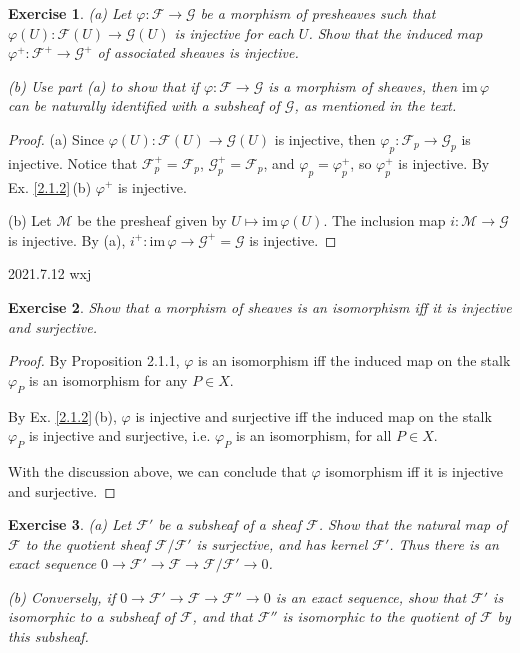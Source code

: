 \documentclass{amsart}
\newtheorem{exe}{Exercise}[subsection]
\begin{document}
\begin{exe}
	\label{2.1.4}
    (a) Let $\varphi :\mathscr{F} \rightarrow  \mathscr{G} $ be a morphism of presheaves such that $\varphi(U) :\mathscr{F}(U) \rightarrow  \mathscr{G}(U) $
    is injective for each $U$. Show that the induced map $\varphi^+ :\mathscr{F}^+ \rightarrow  \mathscr{G}^+ $ of associated sheaves
    is injective.

    (b) Use part (a) to show that if $\varphi :\mathscr{F} \rightarrow  \mathscr{G} $ is a morphism of sheaves,
    then $\mathrm{im}\,\varphi$ can be naturally identified with a subsheaf of $ \mathscr{G}$, as mentioned in the text.
\end{exe}

\begin{proof}
    (a) Since $\varphi(U) :\mathscr{F}(U) \rightarrow  \mathscr{G}(U) $ is injective, then $\varphi_p :\mathscr{F}_p \rightarrow  \mathscr{G}_p $ is injective.
    Notice that $\mathscr{F}_p^+=\mathscr{F}_p$, $\mathscr{G}_p^+=\mathscr{F}_p$, and $\varphi_p=\varphi_p^+$, so $\varphi_p^+$ is injective.
    By Ex. \ref{2.1.2}\,(b) $\varphi^+$ is injective.

    (b) Let $\mathscr{M}$ be the presheaf given by $U\mapsto\mathrm{im}\,\varphi(U)$. The inclusion map $i: \mathscr{M} \rightarrow  \mathscr{G}$ is injective. By (a), $i^+:\mathrm{im}\,\varphi \rightarrow  \mathscr{G}^+=\mathscr{G}$
    is injective.
\end{proof}    

2021.7.12 wxj
\begin{exe}
	\label{2.1.5}
   Show that a morphism of sheaves is an isomorphism iff it is injective and surjective.
\end{exe}

\begin{proof}
   By Proposition 2.1.1, $\varphi$ is an isomorphism iff the induced map on the stalk $\varphi_{P}$ is an isomorphism for any $P \in X$. 
   
   By Ex. \ref{2.1.2}\,(b), $\varphi$ is injective and surjective iff the induced map on the stalk $\varphi_{P}$ is injective and surjective, i.e. $\varphi_P$ is an isomorphism, for all $P \in X$.
   
   With the discussion above, we can conclude that $\varphi$ isomorphism iff it is injective and surjective.
\end{proof}

\begin{exe}
   (a) Let $\mathscr{F}'$ be a subsheaf of a sheaf $\mathscr{F}$. Show that the natural map of $\mathscr{F}$ to the quotient sheaf $\mathscr{F}/\mathscr{F}'$ is surjective, and has kernel $\mathscr{F}'$. Thus there is an exact sequence $0 \rightarrow \mathscr{F}' \rightarrow \mathscr{F} \rightarrow \mathscr{F}/\mathscr{F}' \rightarrow 0$.
   
   (b) Conversely, if $0 \rightarrow \mathscr{F}' \rightarrow \mathscr{F} \rightarrow \mathscr{F}'' \rightarrow 0$ is an exact sequence, show that $\mathscr{F}'$ is isomorphic to a subsheaf of $\mathscr{F}$, and that $\mathscr{F}''$ is isomorphic to the quotient of $\mathscr{F}$ by this subsheaf.
\end{exe}
\end{document}
